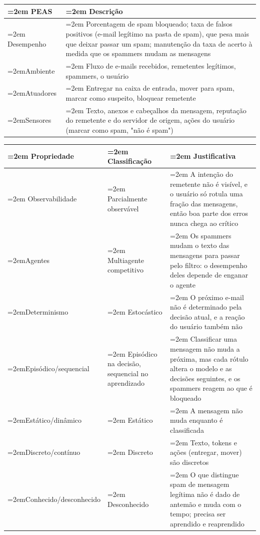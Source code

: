 \documentclass[12pt, a4paper]{article}
\begin{document}
\begingroup
\setlength{\tabcolsep}{4.0pt}
\begin{longtable}{@{}>{\raggedright\hyphenpenalty=30\tolerance=999\emergencystretch=2em\arraybackslash}p{3.90cm}>{\raggedright\hyphenpenalty=30\tolerance=999\emergencystretch=2em\arraybackslash}p{11.10cm}@{}}
\toprule\noalign{}
PEAS & Descrição \\
\midrule\noalign{}
\endhead
\bottomrule\noalign{}
\endlastfoot
Desempenho & Porcentagem de spam bloqueado; taxa de falsos positivos (e-mail legítimo na pasta de spam\allowbreak ), que pesa mais que deixar passar um spam; ma\-nu\-ten\-ção da taxa de acerto à medida que os spammers mudam as mensagens \\
Ambiente & Fluxo de e-mails recebidos, remetentes legítimos, spammers, o usuário \\
Atuadores & Entregar na caixa de entrada, mover para spam, marcar como suspeito, bloquear remetente \\
Sensores & Texto, anexos e ca\-be\-ça\-lhos da mensagem, reputação do remetente e do servidor de origem, ações do usuário (marcar como spam, "não é spam") \\
\end{longtable}
\endgroup

\begingroup
\setlength{\tabcolsep}{4.0pt}
\begin{longtable}{@{}>{\raggedright\hyphenpenalty=30\tolerance=999\emergencystretch=2em\arraybackslash}p{4.51cm}>{\raggedright\hyphenpenalty=30\tolerance=999\emergencystretch=2em\arraybackslash}p{3.24cm}>{\raggedright\hyphenpenalty=30\tolerance=999\emergencystretch=2em\arraybackslash}p{6.97cm}@{}}
\toprule\noalign{}
Propriedade & Clas\-si\-fi\-ca\-ção & Justificativa \\
\midrule\noalign{}
\endhead
\bottomrule\noalign{}
\endlastfoot
Observabilidade & Parcialmente ob\-ser\-vá\-vel & A intenção do remetente não é visível, e o usuário só rotula uma fração das mensagens, então boa parte dos erros nunca chega ao crítico \\
Agentes & Multiagente competitivo & Os spammers mudam o texto das mensagens para passar pelo filtro: o desempenho deles depende de enganar o agente \\
Determinismo & Es\-to\-cás\-tico & O próximo e-mail não é determinado pela decisão atual, e a reação do usuário também não \\
Episódico\slash sequencial & Episódico na decisão, sequencial no aprendizado & Classificar uma mensagem não muda a próxima, mas cada rótulo altera o modelo e as decisões seguintes, e os spammers reagem ao que é bloqueado \\
Estático\slash dinâmico & Estático & A mensagem não muda enquanto é classificada \\
Discreto\slash contínuo & Discreto & Texto, tokens e ações (entregar, mover\allowbreak ) são discretos \\
Conhecido\slash desconhecido & Desconhecido & O que distingue spam de mensagem legítima não é dado de antemão e muda com o tempo; precisa ser aprendido e reaprendido \\
\end{longtable}
\endgroup
\end{document}
